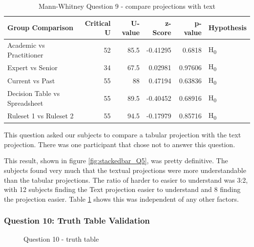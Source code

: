 \begin{table}[H]
    \begin{center}
        \begin{tabular}{ |l ||r |r |r | r|l | } 
            \hline
            Group Comparison                 & Critical U & U-value & z-Score  & p-value & Hypothesis         \\
            \hline
            \hline
            Academic vs Practitioner         & 52         & 85.5    & -0.41295 & 0.6818  & H\textsubscript{0} \\ 
            \hline
            Expert vs Senior                 & 34         & 67.5    & 0.02981  & 0.97606 & H\textsubscript{0} \\ 
            \hline
            Current vs Past                  & 55         & 88      & 0.47194  & 0.63836 & H\textsubscript{0} \\ 
            \hline
            Decision Table vs Spreadsheet    & 55         & 89.5    & -0.40452 & 0.68916 & H\textsubscript{0} \\ 
            \hline
            Ruleset 1 vs Ruleset 2           & 55         & 94.5    & -0.17979 & 0.85716 & H\textsubscript{0} \\ 
            \hline
        \end{tabular}
    \end{center}
    \caption{Mann-Whitney Question 9 - compare projections with text}
    \label{table:mannwhitneyQ5}
\end{table}

This question asked our subjects to compare a tabular projection with the text projection.
There was one participant that chose not to answer this question.

This result, shown in figure \ref{fig:stackedbar_Q5}, was pretty definitive.
The subjects found very much that the textual projections were more understandable than the tabular projections.
The ratio of harder to easier to understand was 3:2, with 12 subjects finding the Text projection easier to understand and 8 finding the projection easier.
Table \ref{table:mannwhitneyQ5} shows this was independent of any other factors.

\subsubsection{Question 10: Truth Table Validation}

\begin{figure}[H]
    \centering
    \caption{Question 10 - truth table}
    \label{fig:stackedbar_Q6}
\end{figure}

